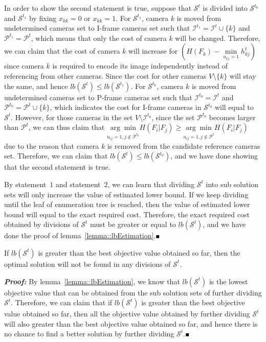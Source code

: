 In order to show the second statement is true, suppose that $\mathcal{S}^t$ is divided into $\mathcal{S}^{t_0}$ and $\mathcal{S}^{t_1}$ by fixing $x_{kk}=0$ or $x_{kk}=1$.
For $\mathcal{S}^{t_1}$, camera $k$ is moved from undetermined cameras set to I-frame cameras set such that $\mathcal{I}^{t_1} = \mathcal{I}^t \cup \{k\}$ and $\mathcal{P}^{t_1} = \mathcal{P}^t$, which means that only the cost of camera $k$ will be changed.
Therefore, we can claim that the cost of camera $k$ will increase for $\left( H(F_k) - \underset{u_{kj}=1}{\min} h_{kj}^t \right)$ since camera $k$ is required to encode its image independently instead of referencing from other cameras.
Since the cost for other cameras $V\setminus \{k\}$ will stay the same, and hence $lb(\mathcal{S}^t) \leq lb(\mathcal{S}^{t_1})$.
For $\mathcal{S}^{t_0}$, camera $k$ is moved from undetermined cameras set to P-frame cameras set such that $\mathcal{I}^{t_0} = \mathcal{I}^t$ and $\mathcal{P}^{t_0} = \mathcal{P}^t \cup \{k\}$, which indicates the cost for I-frame cameras in $\mathcal{S}^{t_0}$ will equal to $\mathcal{S}^t$.
However, for those cameras in the set $V \setminus \mathcal{I}^{t_0}$, since the set $\mathcal{P}^{t_0}$ becomes larger than $\mathcal{P}^t$, we can thus claim that $\underset{u_{ij}=1, j \notin \mathcal{P}^{t_0}}{\arg\min} H(F_i|F_j) \geq \underset{u_{ij}=1, j \notin \mathcal{P}^{t}}{\arg\min} H(F_i|F_j)$ due to the reason that camera $k$ is removed from the candidate reference cameras set.
Therefore, we can claim that $lb(\mathcal{S}^t) \leq lb(\mathcal{S}^{t_0})$, and we have done showing that the second statement is true.

By statement~$1$ and statement~$2$, we can learn that dividing $\mathcal{S}^t$ into sub solution sets will only increase the value of estimated lower bound.
If we keep dividing until the leaf of enumeration tree is reached, then the value of estimated lower bound will equal to the exact required cost.
Therefore, the exact required cost obtained by divisions of $\mathcal{S}^t$ must be greater or equal to $lb(\mathcal{S}^t)$, and we have done the proof of lemma~\ref{lemma::lbEstimation}.\hfill$\mathsmaller{\mathsmaller{\blacksquare}}$

\begin{mythm}
If $lb(\mathcal{S}^t)$ is greater than the best objective value obtained so far, then the optimal solution will not be found in any divisions of $\mathcal{S}^t$.
\label{theorem::bound}
\end{mythm}
\textbf{\emph{Proof:}}
By lemma~\ref{lemma::lbEstimation}, we know that $lb(\mathcal{S}^t)$ is the lowest objective value that can be obtained from the sub solution sets of further dividing $\mathcal{S}^t$.
Therefore, we can claim that if $lb(\mathcal{S}^t)$ is greater than the best objective value obtained so far, then all the objective value obtained by further dividing $\mathcal{S}^t$ will also greater than the best objective value obtained so far, and hence there is no chance to find a better solution by further dividing $\mathcal{S}^t$.\hfill$\mathsmaller{\mathsmaller{\blacksquare}}$

